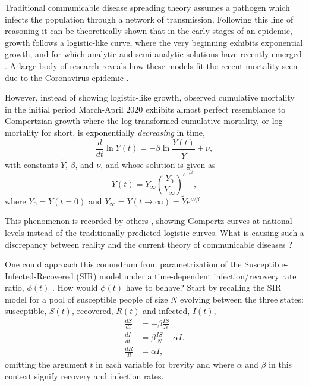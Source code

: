 \documentclass[review]{elsarticle}
\newcommand{\insertSmallPdfFig}[3]{
  \begin{figure}[h]
  \centering
  \texttt{[image: \#1.pdf]}
  \caption{#2}
  \label{fig:#1}
  \end{figure}
}
\begin{document}
Traditional communicable disease spreading theory assumes a pathogen which infects the population through a network of transmission. 
Following this line of reasoning it can be theoretically shown that in the early stages of an epidemic, growth follows a logistic-like curve, where the very beginning exhibits exponential growth, and for which analytic and semi-analytic solutions have recently emerged \citep{harko2014exact,kroger2020analytical,schlickeiser2021analytical,heng2020approximately}. 
A large body of research reveals how these models fit the recent mortality seen due to the Coronavirus epidemic \citep{carletti2020covid,cooper2020sir,postnikov2020estimation,munoz2021sir,cooper2022dynamical,saikia2021covid}. 

However, instead of showing logistic-like growth, observed cumulative mortality in the initial period March-April 2020 exhibits almost perfect resemblance to Gompertzian growth \citep{Gompertz1825,bajzer1997mathematical} where the log-transformed cumulative mortality, or log-mortality for short, is exponentially \emph{decreasing} in time,
\begin{equation}
\label{eq:GompertzODE}
\frac{d}{dt}\ln{Y(t)} = -\beta\ln{\frac{Y(t)}{\tilde{Y}}} + \nu,
\end{equation} 
with constants $\tilde{Y}$, $\beta$, and $\nu$, and whose solution is given as
\begin{equation}
\label{eq:gomp_solution}
Y(t) = Y_\infty \left(\frac{Y_0}{Y_\infty}\right)^{e^{-\beta t}},
\end{equation}
where $Y_{0}=Y(t = 0)$ and $Y_{\infty}=Y(t\rightarrow \infty)=\tilde{Y}e^{\nu/\beta}$. 


This phenomenon is recorded by others \citep{Ohnishi2020,Rypdal2020,Catala2020,rodrigues2020monte,Levitt2020}, showing Gompertz curves at national levels instead of the traditionally predicted logistic curves. What is causing such a discrepancy between reality and the current theory of communicable diseases \citep{castro2020turning}?

One could approach this conundrum from parametrization of the Susceptible-Infected-Recovered (SIR) model under a time-dependent infection/recovery rate ratio, $\phi(t)$ \citep{kermack1927contribution}. How would $\phi(t)$ have to behave? Start by recalling the SIR model for a pool of susceptible people of size $N$ evolving between the three states: susceptible, $S(t)$, recovered, $R(t)$ and infected, $I(t)$,
\begin{align}
\label{eq:SIR}
\frac{dS}{dt}& = -\beta \frac{IS}{N}\nonumber\\
\frac{dI}{dt}& = \beta \frac{IS}{N} - \alpha I.\\
\frac{dR}{dt}& = \alpha I\nonumber,
\end{align}
omitting the argument $t$ in each variable for brevity and where $\alpha$ and $\beta$ in this context signify recovery and infection rates.
\end{document}
